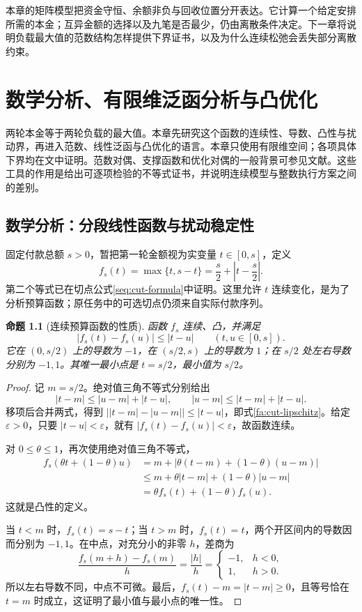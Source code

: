 \documentclass[UTF8,a4paper]{ctexbook}
\newtheorem{proposition}[theorem]{命题}
\theoremstyle{definition}
\numberwithin{equation}{chapter}
\newcommand{\1}{\mathbf{1}}
\begin{document}
本章的矩阵模型把资金守恒、余额非负与回收位置分开表达。它计算一个给定安排所需的本金；互异金额的选择以及九笔是否最少，仍由离散条件决定。下一章将说明负载最大值的范数结构怎样提供下界证书，以及为什么连续松弛会丢失部分离散约束。

\chapter{数学分析、有限维泛函分析与凸优化}\label{fa:chapter}

两轮本金等于两轮负载的最大值。本章先研究这个函数的连续性、导数、凸性与扰动界，再进入范数、线性泛函与凸优化的语言。本章只使用有限维空间；各项具体下界均在文中证明。范数对偶、支撑函数和优化对偶的一般背景可参见文献\cite{boyd}。这些工具的作用是给出可逐项检验的不等式证书，并说明连续模型与整数执行方案之间的差别。

\section{数学分析：分段线性函数与扰动稳定性}\label{fa:analysis-section}

固定付款总额 $s>0$，暂把第一轮金额视为实变量 $t\in[0,s]$，定义
\[
f_s(t)=\max\{t,s-t\}=\frac{s}{2}+\left|t-\frac{s}{2}\right|.
\]
第二个等式已在切点公式\eqref{seq:cut-formula}中证明。这里允许 $t$ 连续变化，是为了分析预算函数；原任务中的可选切点仍须来自实际付款序列。

\begin{proposition}[连续预算函数的性质]\label{fa:piecewise-analysis}
函数 $f_s$ 连续、凸，并满足
\begin{equation}\label{fa:cut-lipschitz}
|f_s(t)-f_s(u)|\le|t-u|\qquad(t,u\in[0,s]).
\end{equation}
它在 $(0,s/2)$ 上的导数为 $-1$，在 $(s/2,s)$ 上的导数为 $1$；在 $s/2$ 处左右导数分别为 $-1,1$。其唯一最小点是 $t=s/2$，最小值为 $s/2$。
\end{proposition}
\begin{proof}
记 $m=s/2$。绝对值三角不等式分别给出
\[
|t-m|\le|u-m|+|t-u|,
\qquad
|u-m|\le|t-m|+|t-u|.
\]
移项后合并两式，得到 $\bigl||t-m|-|u-m|\bigr|\le|t-u|$，即式\eqref{fa:cut-lipschitz}。给定 $\varepsilon>0$，只要 $|t-u|<\varepsilon$，就有 $|f_s(t)-f_s(u)|<\varepsilon$，故函数连续。

对 $0\le\theta\le1$，再次使用绝对值三角不等式，
\begin{align*}
f_s(\theta t+(1-\theta)u)
&=m+|\theta(t-m)+(1-\theta)(u-m)|\\
&\le m+\theta|t-m|+(1-\theta)|u-m|\\
&=\theta f_s(t)+(1-\theta)f_s(u).
\end{align*}
这就是凸性的定义。

当 $t<m$ 时，$f_s(t)=s-t$；当 $t>m$ 时，$f_s(t)=t$，两个开区间内的导数因而分别为 $-1,1$。在中点，对充分小的非零 $h$，差商为
\[
\frac{f_s(m+h)-f_s(m)}{h}=\frac{|h|}{h}
=\begin{cases}-1,&h<0,\\1,&h>0.\end{cases}
\]
所以左右导数不同，中点不可微。最后，$f_s(t)-m=|t-m|\ge0$，且等号恰在 $t=m$ 时成立，这证明了最小值与最小点的唯一性。
\end{proof}
\end{document}
